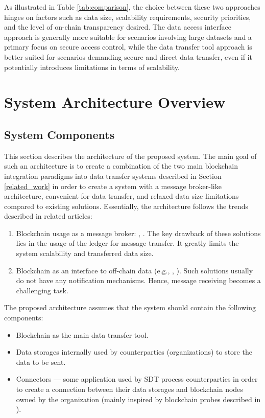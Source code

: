 \documentclass[10pt]{llncs}
\begin{document}
As illustrated in Table \ref{tab:comparison}, the choice between these two approaches hinges on factors such as data size, scalability requirements, security priorities, 
and the level of on-chain transparency desired. 
The data access interface approach is generally more suitable for scenarios involving large datasets and a primary focus on secure access control, while the data transfer tool 
approach is better suited for scenarios demanding secure and direct data transfer, even if it potentially introduces limitations in terms of scalability.

\section{System Architecture Overview} \label{architecture}

\subsection{System Components}

This section describes the architecture of the proposed system.
The main goal of such an architecture is to create a combination of the two main blockchain integration paradigms into data transfer systems described in Section \ref{related_work}
in order to create a system with a message broker-like architecture, convenient for data transfer, and relaxed data size limitations compared to existing solutions.
Essentially, the architecture follows the trends described in related articles:

\begin{enumerate}
    \item Blockchain usage as a message broker: \cite{Ghaemi2021}, \cite{kim2020hybrid}. 
    The key drawback of these solutions lies in the usage of the ledger for message transfer.
    It greatly limits the system scalability and transferred data size. 
    \item Blockchain as an interface to off-chain data (e.g., \cite{Jia2023}, \cite{Wang2024}).
    Such solutions usually do not have any notification mechanisms.
    Hence, message receiving becomes a challenging task.
\end{enumerate}

The proposed architecture assumes that the system should contain the following components:

\begin{itemize}
    \item Blockchain as the main data transfer tool. 
    \item Data storages internally used by counterparties (organizations) to store the data to be sent.
    \item Connectors --- some application used by SDT process counterparties in order to create a connection between their data storages
    and blockchain nodes owned by the organization (mainly inspired by blockchain probes described in \cite{Jia2023}).
\end{itemize}
\end{document}
